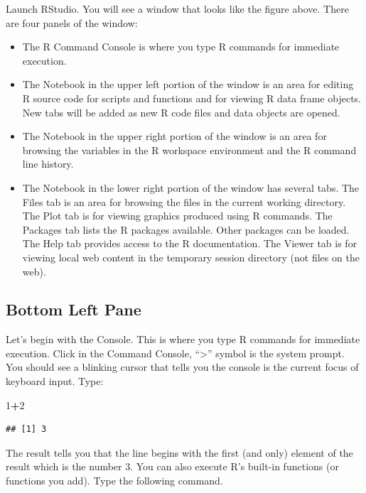 \documentclass[
]{book}
\newenvironment{Shaded}{\begin{snugshade}}{\end{snugshade}}
\newcommand{\DecValTok}[1]{\textcolor[rgb]{0.00,0.00,0.81}{#1}}
\newcommand{\OperatorTok}[1]{\textcolor[rgb]{0.81,0.36,0.00}{\textbf{#1}}}
\begin{document}
Launch RStudio. You will see a window that looks like the figure above. There are four panels of the window:

\begin{itemize}
\item
  The R Command Console is where you type R commands for immediate execution.
\item
  The Notebook in the upper left portion of the window is an area for editing R source code for scripts and functions and for viewing R data frame objects. New tabs will be added as new R code files and data objects are opened.
\item
  The Notebook in the upper right portion of the window is an area for browsing the variables in the R workspace environment and the R command line history.
\item
  The Notebook in the lower right portion of the window has several tabs. The Files tab is an area for browsing the files in the current working directory. The Plot tab is for viewing graphics produced using R commands. The Packages tab lists the R packages available. Other packages can be loaded. The Help tab provides access to the R documentation. The Viewer tab is for viewing local web content in the temporary session directory (not files on the web).
\end{itemize}

\hypertarget{bottom-left-pane}{%
\subsection*{Bottom Left Pane}\label{bottom-left-pane}}

Let's begin with the Console. This is where you type R commands for immediate execution. Click in the Command Console, ``\textgreater{}'' symbol is the system prompt. You should see a blinking cursor that tells you the console is the current focus of keyboard input. Type:

\begin{Shaded}
\begin{Highlighting}[]
\DecValTok{1}\OperatorTok{+}\DecValTok{2}
\end{Highlighting}
\end{Shaded}

\begin{verbatim}
## [1] 3
\end{verbatim}

The result tells you that the line begins with the first (and only) element of the result which is the number 3. You can also execute R's built-in functions (or functions you add). Type the following command.
\end{document}
